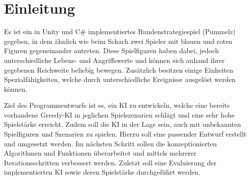 

\chapter{Einleitung}

Es ist ein in Unity und C\# implementiertes Rundenstrategiespiel (\glqq Pummelz\grqq{}) gegeben, in dem ähnlich wie beim Schach zwei Spieler mit blauen und roten Figuren gegeneinander antreten. Diese Spielfiguren haben dabei, jedoch unterschiedliche Lebens- und Angriffswerte und können sich anhand ihrer gegebenen Reichweite beliebig bewegen. Zusätzlich besitzen einige Einheiten Spezialfähigkeiten, welche durch unterschiedliche Ereignisse ausgelöst werden können.

Ziel des Programmentwurfs ist es, ein KI zu entwickeln, welche eine bereits vorhandene Greedy-KI in jeglichen Spielszenarien schlägt und eine sehr hohe Spielstärke erreicht. Zudem soll die KI in der Lage sein, auch mit unbekannten Spielfiguren und Szenarien zu spielen. Hierzu soll eine passender Entwurf erstellt und umgesetzt werden. Im nächsten Schritt sollen die konzeptionierten Algorithmen und Funktionen überarbeitet und mittels mehrerer Iterationsschritten verbessert werden. Zuletzt soll eine Evaluierung der implementierten KI sowie deren Spielstärke durchgeführt werden.